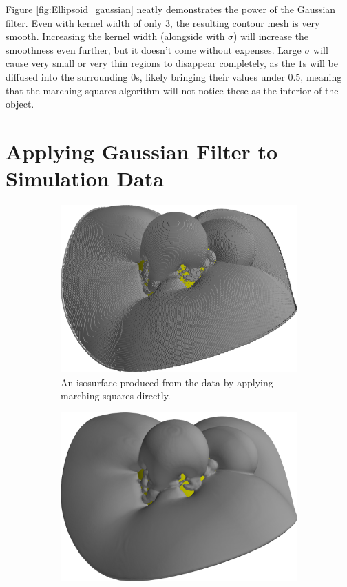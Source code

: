 \documentclass[a4paper,10pt]{report}
\begin{document}
Figure \ref{fig:Ellipsoid_gaussian} neatly demonstrates the power of the Gaussian filter. Even with kernel width of only $3$, the resulting contour mesh is very smooth. Increasing the kernel width (alongside with $\sigma$) will increase the smoothness even further, but it doesn't come without expenses. Large $\sigma$ will cause very small or very thin regions to disappear completely, as the $1$s will be diffused into the surrounding $0$s, likely bringing their values under $0.5$, meaning that the marching squares algorithm will not notice these as the interior of the object.

\section{Applying Gaussian Filter to Simulation Data}
\begin{figure}[H]
    \centering
    \begin{subfigure}{.49\textwidth}
        \includegraphics[width=\textwidth]{../images/3D/Dataset1.png}
    \caption{An isosurface produced from the data by applying marching squares directly.}
    \end{subfigure}
    \hfill
    \begin{subfigure}{.49\textwidth}
        \includegraphics[width=\textwidth]{../images/3D/Dataset1_Gaussian.png}

\end{subfigure}
\end{figure}
\end{document}
